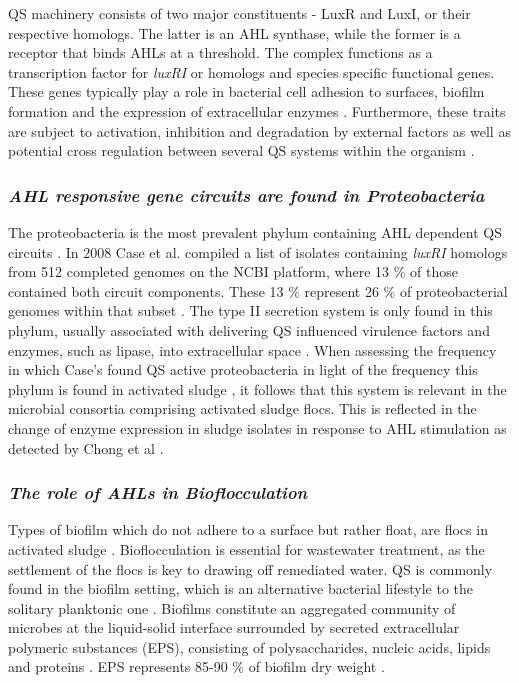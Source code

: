 \documentclass[11pt]{article}
\begin{document}
QS machinery consists of two major constituents - LuxR and LuxI, or their respective homologs. The latter is an AHL synthase, while the former is a receptor that binds AHLs at a threshold. The complex functions as a transcription factor for \textit{luxRI} or homologs and species specific functional genes. These genes typically play a role in bacterial cell adhesion to surfaces, biofilm formation and the expression of extracellular enzymes \cite{Flemming_10}.
Furthermore, these traits are subject to activation, inhibition and degradation by external factors as well as potential cross regulation between several QS systems within the organism \cite{juhas2005}.


\subsubsection{\emph{AHL responsive gene circuits are found in Proteobacteria}}
The proteobacteria is the most prevalent phylum containing AHL dependent QS circuits \cite{gelencser_12}. In 2008 Case et al. compiled a list of isolates containing \emph{luxRI} homologs from 512 completed genomes on the NCBI platform, where 13 \% of those contained both circuit components. These 13 \% represent 26 \% of proteobacterial genomes within that subset \cite{case_08}.
The type II secretion system is only found in this phylum, usually associated with delivering QS influenced virulence factors and enzymes, such as lipase, into extracellular space \cite{sandkvist2001}. 
When assessing the frequency in which Case's found QS active proteobacteria \cite{case_08} in light of the frequency this phylum is found in activated sludge \cite{Wagner_02,Hesham_11}, it follows that this system is relevant in the microbial consortia comprising activated sludge flocs. This is reflected in the change of enzyme expression in sludge isolates in response to AHL stimulation as detected by Chong et al \cite{Chong_12}. 

\subsubsection{\emph{The role of AHLs in Bioflocculation}}
Types of biofilm which do not adhere to a surface but rather float, are flocs in activated sludge \cite{wingender1999}. Bioflocculation is essential for wastewater treatment, as the settlement of the flocs is key to drawing off remediated water. QS is commonly found in the biofilm setting, which is an alternative bacterial lifestyle to the solitary planktonic one \cite{webb2003}. Biofilms constitute an aggregated community of microbes at the liquid-solid interface surrounded by secreted extracellular polymeric substances (EPS), consisting of polysaccharides, nucleic acids, lipids and proteins \cite{wingender1999}. EPS represents 85-90 \% of biofilm dry weight \cite{Frolund_96}.
\end{document}
